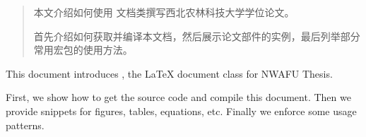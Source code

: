 
\begin{abstract}
本文介绍如何使用\nwafuthesis{} 文档类撰写西北农林科技大学学位论文。

首先介绍如何获取并编译本文档，然后展示论文部件的实例，最后列举部分常用宏包的使用方法。
\end{abstract}

\begin{abstractEn}
This document introduces \nwafuthesis, the \LaTeX{} document class for NWAFU Thesis.

First, we show how to get the source code and compile this document.
Then we provide snippets for figures, tables, equations, etc.
Finally we enforce some usage patterns.
\end{abstractEn}

